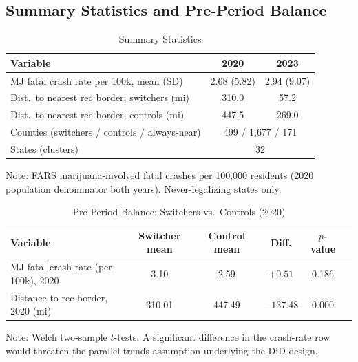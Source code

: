 \documentclass[11pt]{article}
\begin{document}
\subsection{Summary Statistics and Pre-Period Balance}

\begin{table}[htbp]
\centering
\caption{Summary Statistics}
\label{tab:summary}
\begin{tabular}{@{}lcc@{}}
\toprule
Variable & 2020 & 2023 \\
\midrule
MJ fatal crash rate per 100k, mean (SD) & 2.68 (5.82) & 2.94 (9.07) \\
Dist.\ to nearest rec border, switchers (mi) & 310.0 & 57.2 \\
Dist.\ to nearest rec border, controls (mi) & 447.5 & 269.0 \\
Counties (switchers / controls / always-near) & \multicolumn{2}{c}{499 / 1{,}677 / 171} \\
States (clusters) & \multicolumn{2}{c}{32} \\
\bottomrule
\end{tabular}
\vspace{2pt}
\begin{minipage}{0.9\textwidth}
\footnotesize Note: FARS marijuana-involved fatal crashes per 100,000
residents (2020 population denominator both years). Never-legalizing
states only.
\end{minipage}
\end{table}

\begin{table}[htbp]
\centering
\caption{Pre-Period Balance: Switchers vs.\ Controls (2020)}
\label{tab:balance}
\begin{tabular}{@{}lccccc@{}}
\toprule
Variable & Switcher mean & Control mean & Diff. & $p$-value \\
\midrule
MJ fatal crash rate (per 100k), 2020 & 3.10 & 2.59 & $+0.51$ & 0.186 \\
Distance to rec border, 2020 (mi) & 310.01 & 447.49 & $-137.48$ & 0.000 \\
\bottomrule
\end{tabular}
\vspace{2pt}
\begin{minipage}{0.9\textwidth}
\footnotesize Note: Welch two-sample $t$-tests. A significant
difference in the crash-rate row would threaten the parallel-trends
assumption underlying the DiD design.
\end{minipage}
\end{table}
\end{document}
